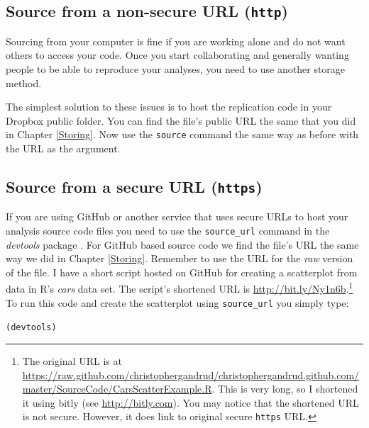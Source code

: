 {\subsection{Source from a non-secure URL (\texttt{http})}

Sourcing from your computer is fine if you are working alone and do not want others to access your code. Once you start collaborating and generally wanting people to be able to reproduce your analyses, you need to
use another storage method.%

The simplest solution to these issues is to host the replication code in your Dropbox public folder. You can find the file's public URL the same that you did in Chapter \ref{Storing}. Now use the \texttt{source} command the same way as before with the URL as the argument.

\subsection{Source from a secure URL (\texttt{https})}

If you are using GitHub or another service that uses secure URLs to host your analysis source code files you need to use the \texttt{source\_url} command in the {\emph{devtools}} package \cite[]{R-devtools}. For GitHub based source code we find the file's URL the same way we did in Chapter \ref{Storing}. Remember to use the URL for the {\emph{raw}} version of the file. I have a short script hosted on GitHub for creating a scatterplot from data in R's {\emph{cars}} data set. The script's shortened URL is \url{http://bit.ly/Ny1n6b}.\footnote{The original URL is at \url{https://raw.github.com/christophergandrud/christophergandrud.github.com/master/SourceCode/CarsScatterExample.R}. This is very long, so I shortened it using bitly (see \url{http://bitly.com}). You may notice that the shortened URL is not secure. However, it does link to original secure {\tt{https}} URL.} To run this code and create the scatterplot using {\tt{source\_url}} you simply type:

\begin{knitrout}
\color{fgcolor}\begin{kframe}
\begin{alltt}
(devtools)


\end{alltt}
\end{kframe}
\end{knitrout}}
